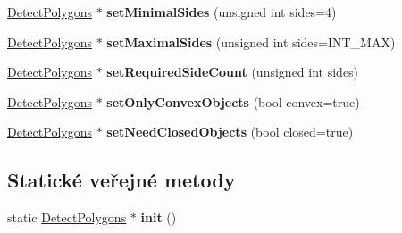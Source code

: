 \begin{DoxyCompactItemize}
\item 
\hypertarget{class_ar_pipe_1_1_detect_polygons_a3e73ca1de8c73f0d3b7ffee515ca326f}{\hyperlink{class_ar_pipe_1_1_detect_polygons}{Detect\-Polygons} $\ast$ {\bfseries set\-Minimal\-Sides} (unsigned int sides=4)}\label{da/d76/class_ar_pipe_1_1_detect_polygons_a3e73ca1de8c73f0d3b7ffee515ca326f}

\item 
\hypertarget{class_ar_pipe_1_1_detect_polygons_a3ab5ade150b5688bf4e1623c35da8b8e}{\hyperlink{class_ar_pipe_1_1_detect_polygons}{Detect\-Polygons} $\ast$ {\bfseries set\-Maximal\-Sides} (unsigned int sides=I\-N\-T\-\_\-\-M\-A\-X)}\label{da/d76/class_ar_pipe_1_1_detect_polygons_a3ab5ade150b5688bf4e1623c35da8b8e}

\item 
\hypertarget{class_ar_pipe_1_1_detect_polygons_acfe20948b75391eb94e9ee36afb1ee40}{\hyperlink{class_ar_pipe_1_1_detect_polygons}{Detect\-Polygons} $\ast$ {\bfseries set\-Required\-Side\-Count} (unsigned int sides)}\label{da/d76/class_ar_pipe_1_1_detect_polygons_acfe20948b75391eb94e9ee36afb1ee40}

\item 
\hypertarget{class_ar_pipe_1_1_detect_polygons_aec7c48f8a867b3f614b28df69e40315b}{\hyperlink{class_ar_pipe_1_1_detect_polygons}{Detect\-Polygons} $\ast$ {\bfseries set\-Only\-Convex\-Objects} (bool convex=true)}\label{da/d76/class_ar_pipe_1_1_detect_polygons_aec7c48f8a867b3f614b28df69e40315b}

\item 
\hypertarget{class_ar_pipe_1_1_detect_polygons_aabb95232ff4714056785cf6f437a7d4f}{\hyperlink{class_ar_pipe_1_1_detect_polygons}{Detect\-Polygons} $\ast$ {\bfseries set\-Need\-Closed\-Objects} (bool closed=true)}\label{da/d76/class_ar_pipe_1_1_detect_polygons_aabb95232ff4714056785cf6f437a7d4f}

\end{DoxyCompactItemize}
\subsection*{Statické veřejné metody}
\begin{DoxyCompactItemize}
\item 
\hypertarget{class_ar_pipe_1_1_detect_polygons_acc4d465f718feca3ba1a25738aaed06a}{static \hyperlink{class_ar_pipe_1_1_detect_polygons}{Detect\-Polygons} $\ast$ {\bfseries init} ()}\label{da/d76/class_ar_pipe_1_1_detect_polygons_acc4d465f718feca3ba1a25738aaed06a}

\end{DoxyCompactItemize}
